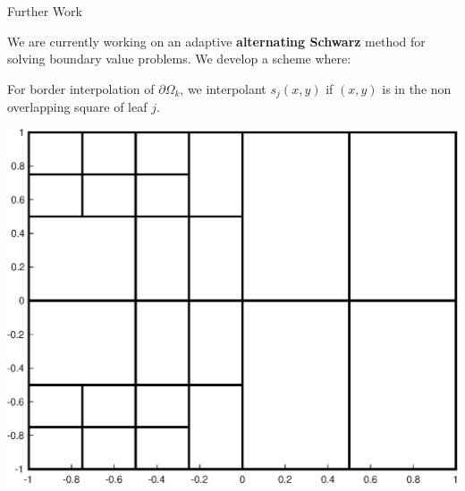 \documentclass{beamer}
\begin{document}
\begin{frame}{Further Work}
	\begin{center}
		We are currently working on an adaptive \textbf{alternating Schwarz} method for solving boundary value problems. We develop a scheme where:
	\end{center}
	\begin{center}
		For border interpolation of $\partial \Omega_k$, we interpolant $s_j(x,y)$ if $(x,y)$ is in the non overlapping square of leaf $j$.
	\end{center}

	\begin{center}
		\includegraphics[scale = 0.3]{zonePlot.eps}
	\end{center}
\end{frame}
\end{document}
